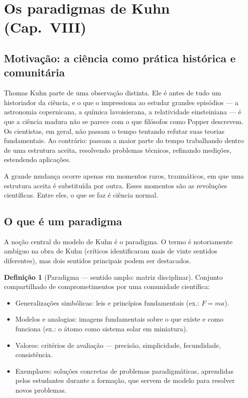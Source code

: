 \documentclass[9pt,a4paper]{extarticle}
\newcommand{\impt}[1]{\textcolor{important}{#1}}
\theoremstyle{definition}
\newtheorem{definition}{Definição}[section]
\begin{document}
\section{Os paradigmas de Kuhn (Cap.~VIII)}

\subsection{Motivação: a ciência como prática histórica e comunitária}

Thomas Kuhn parte de uma observação distinta. Ele é antes de tudo um \impt{historiador da ciência}, e o que o impressiona ao estudar grandes episódios --- a astronomia copernicana, a química lavoisierana, a relatividade einsteiniana --- é que \impt{a ciência madura não se parece com o que filósofos como Popper descrevem}. Os cientistas, em geral, não passam o tempo tentando refutar suas teorias fundamentais. Ao contrário: passam a maior parte do tempo \impt{trabalhando dentro} de uma estrutura aceita, resolvendo problemas técnicos, refinando medições, estendendo aplicações.

A grande mudança ocorre apenas em momentos raros, traumáticos, em que uma estrutura aceita é substituída por outra. Esses momentos são as \impt{revoluções científicas}. Entre eles, o que se faz é \impt{ciência normal}.

\subsection{O que é um paradigma}

A noção central do modelo de Kuhn é o \impt{paradigma}. O termo é notoriamente ambíguo na obra de Kuhn (críticos identificaram mais de vinte sentidos diferentes), mas dois sentidos principais podem ser destacados.

\begin{definition}[Paradigma --- sentido amplo: matriz disciplinar]
Conjunto compartilhado de comprometimentos por uma comunidade científica:
\begin{itemize}
  \item \impt{Generalizações simbólicas}: leis e princípios fundamentais (ex.: $F = ma$).
  \item \impt{Modelos e analogias}: imagens fundamentais sobre o que existe e como funciona (ex.: o átomo como sistema solar em miniatura).
  \item \impt{Valores}: critérios de avaliação --- precisão, simplicidade, fecundidade, consistência.
  \item \impt{Exemplares}: soluções concretas de problemas paradigmáticas, aprendidas pelos estudantes durante a formação, que servem de modelo para resolver novos problemas.
\end{itemize}
\end{definition}
\end{document}
